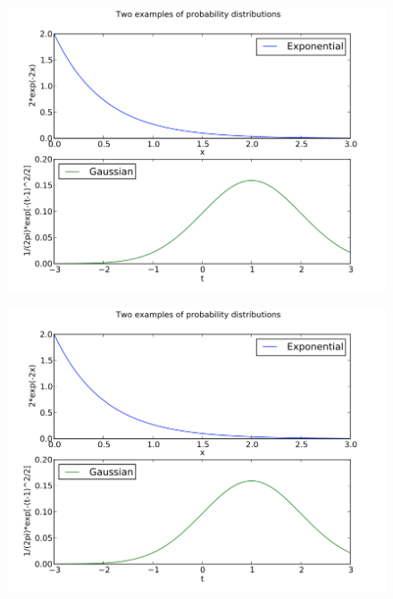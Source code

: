 \documentclass{article}
\begin{document}
\begin{figure}
\centering
\includegraphics[width=1\linewidth]{example1.png}
\end{figure}

\begin{figure}
\centering
\includegraphics[width=1\linewidth]{example1.png}
\end{figure}
\end{document}
